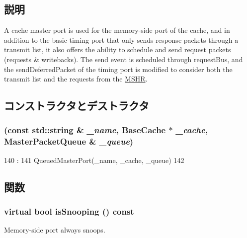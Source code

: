 \subsection{説明}
A cache master port is used for the memory-\/side port of the cache, and in addition to the basic timing port that only sends response packets through a transmit list, it also offers the ability to schedule and send request packets (requests \& writebacks). The send event is scheduled through requestBus, and the sendDeferredPacket of the timing port is modified to consider both the transmit list and the requests from the \hyperlink{classMSHR}{MSHR}. 

\subsection{コンストラクタとデストラクタ}
\hypertarget{classBaseCache_1_1CacheMasterPort_a566970d81040531eb8a0e5ea092e6683}{
\subsubsection[{CacheMasterPort}]{ (const std::string \& {\em \_\-name}, \/  {\bf BaseCache} $\ast$ {\em \_\-cache}, \/  {\bf MasterPacketQueue} \& {\em \_\-queue})}}
\label{classBaseCache_1_1CacheMasterPort_a566970d81040531eb8a0e5ea092e6683}



\begin{DoxyCode}
140                                                    :
141             QueuedMasterPort(_name, _cache, _queue)
142         { }

\end{DoxyCode}


\subsection{関数}
\hypertarget{classBaseCache_1_1CacheMasterPort_a32602a6a3c3d66a639455036d6c08dd6}{
\subsubsection[{isSnooping}]{\setlength{\rightskip}{0pt plus 5cm}virtual bool isSnooping () const}}
\label{classBaseCache_1_1CacheMasterPort_a32602a6a3c3d66a639455036d6c08dd6}
Memory-\/side port always snoops.

